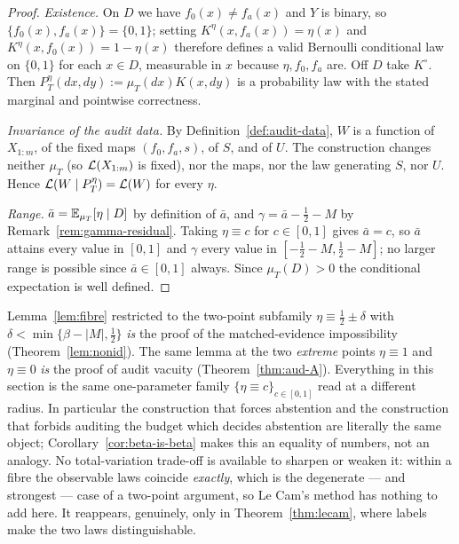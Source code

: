 \begin{proof}
\emph{Existence.} On $D$ we have $f_0(x)\neq f_a(x)$ and $Y$ is binary, so
$\{f_0(x),f_a(x)\}=\{0,1\}$; setting $K^\eta(x,f_a(x))=\eta(x)$ and
$K^\eta(x,f_0(x))=1-\eta(x)$ therefore defines a valid Bernoulli conditional law on
$\{0,1\}$ for each $x\in D$, measurable in $x$ because $\eta,f_0,f_a$ are. Off $D$ take
$K^\circ$. Then $P_T^\eta(dx,dy):=\mu_T(dx)K(x,dy)$ is a probability law with the stated
marginal and pointwise correctness.

\emph{Invariance of the audit data.} By Definition~\ref{def:audit-data}, $W$ is a function of
$X_{1:m}$, of the fixed maps $(f_0,f_a,s)$, of $S$, and of $U$. The construction changes
neither $\mu_T$ (so $\mathcal{L}(X_{1:m})$ is fixed), nor the maps, nor the law generating $S$, nor
$U$. Hence $\mathcal{L}(W\mid P_T^\eta)=\mathcal{L}(W)$ for every $\eta$.

\emph{Range.} $\bar a=\mathbb{E}_{\mu_T}[\eta\mid D]$ by definition of $\bar a$, and
$\gamma=\bar a-\tfrac12-M$ by Remark~\ref{rem:gamma-residual}. Taking $\eta\equiv c$ for
$c\in[0,1]$ gives $\bar a=c$, so $\bar a$ attains every value in $[0,1]$ and $\gamma$ every
value in $[-\tfrac12-M,\tfrac12-M]$; no larger range is possible since $\bar a\in[0,1]$
always. Since $\mu_T(D)>0$ the conditional expectation is well defined.
\end{proof}

\begin{remark}\label{rem:one-construction}
Lemma~\ref{lem:fibre} restricted to the two-point subfamily $\eta\equiv\tfrac12\pm\delta$ with
$\delta<\min\{\beta-|M|,\tfrac12\}$ \emph{is} the proof of the matched-evidence impossibility
(Theorem~\ref{lem:nonid}). The same lemma at the two \emph{extreme} points $\eta\equiv1$ and
$\eta\equiv0$ \emph{is} the proof of audit vacuity (Theorem~\ref{thm:aud-A}). Everything in
this section is the same one-parameter family $\{\eta\equiv c\}_{c\in[0,1]}$ read at a
different radius. In particular the construction that forces abstention and the construction
that forbids auditing the budget which decides abstention are literally the same object;
Corollary~\ref{cor:beta-is-beta} makes this an equality of numbers, not an analogy.
No total-variation trade-off is available to sharpen or weaken it: within a fibre the
observable laws coincide \emph{exactly}, which is the degenerate --- and strongest --- case
of a two-point argument, so Le Cam's method has nothing to add here. It reappears, genuinely,
only in Theorem~\ref{thm:lecam}, where labels make the two laws distinguishable.
\end{remark}


